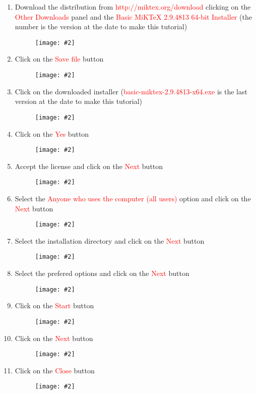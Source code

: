 \documentclass[a4paper]{article}
\newcommand{\FIG}[2]
{
	\begin{figure}[ht!]
	\centering
	\texttt{[image: \#2]}
	\end{figure}
}
\newcommand{\FIGUREB}[1]{\FIG{0.26}{#1}}
\newcommand{\RED}[1] {\textcolor{red}{#1}}
\begin{document}
\begin{enumerate}

\item Download the distribution from \RED{http://miktex.org/download} clicking
on the \RED{Other Downloads} panel and the
\RED{Basic MiKTeX 2.9.4813 64-bit Installer} (the number is the version at the
date to make this tutorial)
\FIGUREB{Latex-1.png.eps}

\clearpage

\item Click on the \RED{Save file} button
\FIGUREB{Latex-2.png.eps}

\item Click on the downloaded installer (\RED{basic-miktex-2.9.4813-x64.exe}
is the last version at the date to make this tutorial)
\FIGUREB{Latex-3.png.eps}

\clearpage

\item Click on the \RED{Yes} button
\FIGUREB{Latex-4.png.eps}

\item Accept the license and click on the \RED{Next} button
\FIGUREB{Latex-5.png.eps}

\clearpage

\item Select the \RED{Anyone who uses the computer (all users)} option and click
on the \RED{Next} button
\FIGUREB{Latex-6.png.eps}

\item Select the installation directory and click on the \RED{Next} button
\FIGUREB{Latex-7.png.eps}

\clearpage

\item Select the prefered options and click on the \RED{Next} button
\FIGUREB{Latex-8.png.eps}

\item Click on the \RED{Start} button
\FIGUREB{Latex-9.png.eps}

\clearpage

\item Click on the \RED{Next} button
\FIGUREB{Latex-10.png.eps}

\item Click on the \RED{Close} button
\FIGUREB{Latex-11.png.eps}

\end{enumerate}
\end{document}
